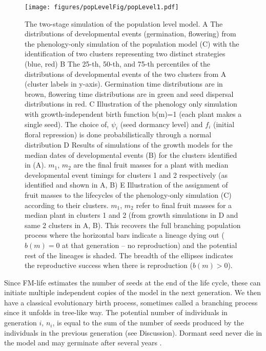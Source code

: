 \begin{figure}[p]
\centering
\texttt{[image: figures/popLevelFig/popLevel1.pdf]}
\caption{The two-stage simulation of the population level model. A The
  distributions of developmental events (germination, flowering) from the
  phenology-only simulation of the population model (C) with the identification
  of two clusters representing two distinct strategies (blue, red) B The 25-th,
  50-th, and 75-th percentiles of the distributions of developmental events of
  the two clusters from A (cluster labels in y-axis). Germination time
  distributions are in brown, flowering time distributions are in green and seed
  dispersal distributions in red. C Illustration of the phenology only simulation
  with growth-independent birth function b(m)=1 (each plant makes a single
  seed). The choice of, $\psi_i$ (seed dormancy level) and $f_i$ (initial floral
  repression) is done probabilistically through a normal distribution D Results
  of simulations of the growth models for the median dates of developmental
  events (B) for the clusters identified in (A). $m_1$, $m_2$ are the final
  fruit masses for a plant with median developmental event timings for clusters
  1 and 2 respectively (as identified and shown in A, B) E Illustration of the
  assignment of fruit masses to the lifecycles of the phenology-only simulation
  (C) according to their clusters. $m_1$, $m_2$ refer to final fruit masses for
  a median plant in clusters 1 and 2 (from growth simulations in D and same 2
  clusters in A, B). This recovers the full branching population process where
  the horizontal bars indicate a lineage dying out ($b(m)=0$ at that generation
  -- no reproduction) and the potential rest of the lineages is shaded. The
  breadth of the ellipses indicates the reproductive success when there is
  reproduction ($b(m) > 0$).}
\label{fig:popModel}
\end{figure}

Since FM-life estimates the number of seeds at the end of the life cycle, these
can initiate multiple independent copies of the model in the next generation. We
then have a classical evolutionary birth process, sometimes called a branching
process since it unfolds in tree-like way. The potential number of individuals
in generation \(i\), \(n_{i}\), is equal to the sum of the number of seeds
produced by the individuals in the previous generation (see Discussion). Dormant
seed never die in the model and may germinate after several years
\citep{burghardt_modeling_2015}.

